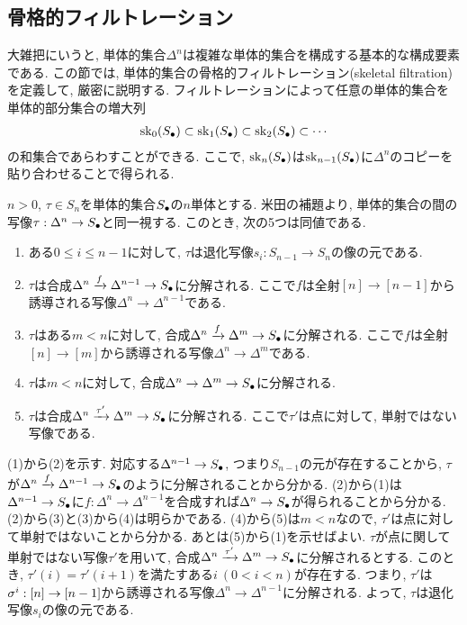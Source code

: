 \documentclass[uplatex, a4paper, 14Q, dvipdfmx]{jsreport}
\begin{document}
\begin{exe}
  
\end{exe}

\subsection{骨格的フィルトレーション}

大雑把にいうと, 単体的集合$\Delta^n$は複雑な単体的集合を構成する基本的な構成要素である. 
この節では, 単体的集合の骨格的フィルトレーション(skeletal filtration)を定義して, 厳密に説明する. 
フィルトレーションによって任意の単体的集合を単体的部分集合の増大列
\begin{align*}
  \sk_0(\S) \subset \sk_1(\S) \subset \sk_2(\S) \subset \cdots
\end{align*}
の和集合であらわすことができる. 
ここで, $\sk_n(\S)$は$\sk_{n-1}(\S)$に$\Delta^n$のコピーを貼り合わせることで得られる. 

\begin{prop}
  $n>0$, $\tau \in S_n$を単体的集合$\S$の$n$単体とする. 
  米田の補題より, 単体的集合の間の写像$\tau: \Delta^n \to \S$と同一視する. 
  このとき, 次の5つは同値である.
  \begin{enumerate}
    \item ある$0 \leq i \leq n-1$に対して, $\tau$は退化写像$s_i: S_{n-1} \to S_n$の像の元である. 
    
    \item $\tau$は合成$\Delta^n \xr{f} \Delta^{n-1} \to \S$に分解される. 
    ここで$f$は全射$[n] \to [n-1]$から誘導される写像$\Delta^n \to \Delta^{n-1}$である. 
    
    \item $\tau$はある$m < n$に対して, 合成$\Delta^n \xr{f} \Delta^m \to \S$に分解される. 
    ここで$f$は全射$[n] \to [m]$から誘導される写像$\Delta^n \to \Delta^m$である. 
    
    \item $\tau$は$m<n$に対して, 合成$\Delta^n \to \Delta^m \to \S$に分解される. 
    
    \item $\tau$は合成$\Delta^n \xr{\tau'} \Delta^m \to \S$に分解される. 
    ここで$\tau'$は点に対して, 単射ではない写像である. 
  \end{enumerate} 
\end{prop}

\begin{Proof}
  (1)から(2)を示す. 
  対応する$\Delta^{n-1} \to \S$, つまり$S_{n-1}$の元が存在することから, $\tau$が$\Delta^n \xr{f} \Delta^{n-1} \to \S$のように分解されることから分かる. 
  (2)から(1)は$\Delta^{n-1} \to \S$に$f: \Delta^n \to \Delta^{n-1}$を合成すれば$\Delta^n \to \S$が得られることから分かる.
  (2)から(3)と(3)から(4)は明らかである.  
  (4)から(5)は$m < n$なので, $\tau'$は点に対して単射ではないことから分かる. 
  あとは(5)から(1)を示せばよい. 
  $\tau$が点に関して単射ではない写像$\tau'$を用いて, 合成$\Delta^n \xr{\tau'} \Delta^m \to \S$に分解されるとする. 
  このとき, $\tau'(i)=\tau'(i+1)$を満たすある$i ~(0<i<n)$が存在する. 
  つまり, $\tau'$は$\si^i: [n] \to [n-1]$から誘導される写像$\Delta^n \to \Delta^{n-1}$に分解される. 
  よって, $\tau$は退化写像$s_i$の像の元である. 
\end{Proof}
\end{document}
